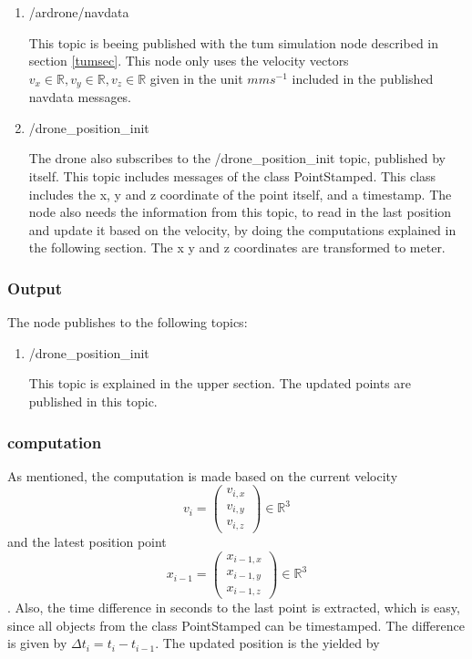 	\begin{enumerate}
	\item{/ardrone/navdata}
	
	This topic is beeing published with the tum simulation node described in section \ref{tumsec}.
	This node only uses the velocity vectors
	$v_x \in \mathbb{R}, v_y \in \mathbb{R}, v_z \in \mathbb{R}$ given in the unit $mms^{-1}$ included in the published navdata messages. 
	
	\item{/drone\_position\_init}
	
	The drone also subscribes to the /drone\_position\_init topic, published by itself. This topic includes messages of the class PointStamped. 
	This class includes the x, y and z coordinate of the point itself, and a timestamp.  
	The node also needs the information from this topic, 
	to read in the last position and update it based on the velocity, by doing the computations explained in the following section. The x y and z 
	coordinates are transformed to meter. 
	\end{enumerate}
	
	\subsubsection{Output}
	
	The node publishes to the following topics:
	
	\begin{enumerate}
	\item{/drone\_position\_init}
	
	This topic is explained in the upper section. The updated points are published in this topic.
	
	\end{enumerate}
	
	\subsubsection{computation}
	
	As mentioned, the computation is made based on the current velocity $$v_i = \begin{pmatrix} v_{i,x} \\ v_{i,y} \\ v_{i,z} \end{pmatrix} \in \mathbb{R}^3$$ and the 
	latest position point $$x_{i-1} = \begin{pmatrix} x_{i-1,x} \\ x_{i-1,y} \\ x_{i-1, z} \end{pmatrix} \in \mathbb{R}^3$$. Also, the time difference 
	in seconds to the last point is extracted, which is easy, since all objects from the class PointStamped can be timestamped. The difference is given by 
	$\Delta t_i =  t_i - t_{i-1}$. The updated position is the yielded by
	

